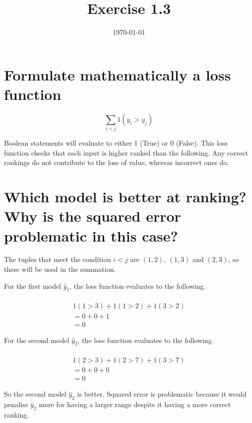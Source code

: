 \documentclass{article}
\title{Exercise 1.3}
\date{\today}
\begin{document}
\maketitle

\section{Formulate mathematically a loss function}

   \[
   \sum_{i < j} {1}(y_i > y_j)
   \]

   Boolean statements will evaluate to either 1 (True) or 0 (False). This loss function checks that each input is higher ranked than the following. Any correct rankings do not contribute to the loss of value, whereas incorrect ones do.


\section{Which model is better at
ranking? Why is the squared error problematic in this case?}

The tuples that meet the condition $i < j$ are $(1,2)$, $(1,3)$ and $(2,3)$, so these will be used in the summation.

For the first model $\hat{y}_1$, the loss function evaluates to the following.

   \begin{multline}
   \\
   {1}(1 > 3) + {1}(1 > 2) + {1}(3 > 2) \\
   = 0 + 0 + 1 \\
   = 0
   \end{multline}

For the second model $\hat{y}_2$, the loss function evaluates to the following.

   \begin{multline}
   \\
   {1}(2 > 3) + {1}(2 > 7) + {1}(3 > 7) \\
   = 0 + 0 + 0 \\
   = 0
   \end{multline}

So the second model $\hat{y}_2$ is better. Squared error is problematic because it would penalise $\hat{y}_2$ more for having a larger range despite it having a more correct ranking.
\end{document}
